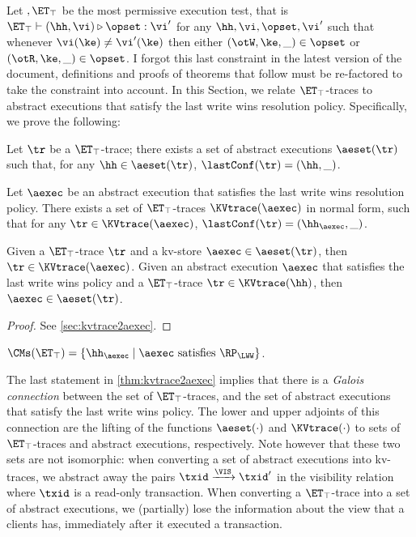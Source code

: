 Let $,\ET_\top$ be the most permissive execution test, that is 
$\ET_\top \vdash (\hh, \vi) \triangleright \opset: \vi'$ for any $\hh, \vi, \opset, \vi'$ 
such that whenever $\vi(\ke) \neq \vi'(\ke)$ then either $(\otW, \ke, \_) \in \opset$ 
or $(\otR, \ke, \_) \in \opset$.
{\color{red} I forgot this last constraint in the latest version of the document, definitions 
and proofs of theorems that follow must be re-factored to take the constraint into account.}
In this Section, we relate $\ET_{\top}$-traces to abstract executions that satisfy the last write wins 
resolution policy. Specifically, we prove the following: 
\begin{theorem}
\label{thm:kvtrace2aexec}
Let $\tr$ be a $\ET_{\top}$-trace; there exists a set of abstract executions $\aeset({\tr})$ 
such that, for any $\hh \in \aeset(\tr)$, $\lastConf(\tr) = (\hh, \_)$.

Let $\aexec$ be an abstract execution that satisfies the last write wins resolution policy. 
There exists a set of $\ET_{\top}$-traces $\KVtrace({\aexec})$ in normal form, 
such that for any $\tr \in \KVtrace({\aexec})$, $\lastConf(\tr) = (\hh_{\aexec}, \_)$. 

{\color{red} Given a $\ET_{\top}$-trace $\tr$ and a kv-store $\aexec \in \aeset(\tr)$, then 
$\tr \in \KVtrace(\aexec)$. Given an abstract execution $\aexec$ that satisfies 
the last write wins policy and a $\ET_{\top}$-trace $\tr \in \KVtrace(\hh)$, 
then $\aexec \in \aeset(\tr)$. }
\end{theorem}
\begin{proof}
    See \cref{sec:kvtrace2aexec}.
\end{proof}

\begin{corollary} 
\label{cor:kvtrace2aexec}
$\CMs(\ET_{\top}) = \{\hh_{\aexec} \mid \aexec \text{ satisfies } \RP_{\LWW}\}$.
\end{corollary}

The last statement in \cref{thm:kvtrace2aexec} implies that there is a \emph{Galois connection}
between the set of $\ET_{\top}$-traces, and the set of abstract executions that satisfy the 
last write wins policy. The lower and upper adjoints of this connection are the 
lifting of the functions $\aeset(\cdot)$ and $\KVtrace(\cdot)$ to sets of $\ET_{\top}$-traces 
and abstract executions, respectively. Note however that these two sets are not isomorphic: 
when converting a set of abstract executions into kv-traces, we abstract away the 
pairs $\txid \xrightarrow{\VIS} \txid'$ in the visibility relation where $\txid$ is a read-only 
transaction. When converting a $\ET_{\top}$-trace into a set of abstract executions, 
we (partially) lose the information about the view that a clients has, immediately after it executed a transaction.

